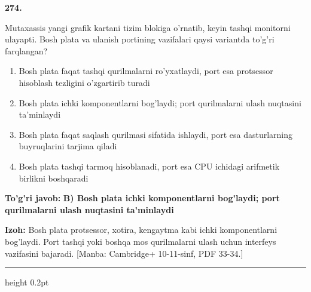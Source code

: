 \documentclass[10pt,a4paper]{article}
\begin{document}
{\bfseries\sffamily\color{ink} 274.}
\par
Mutaxassis yangi grafik kartani tizim blokiga o'rnatib, keyin tashqi monitorni ulayapti. Bosh plata va ulanish portining vazifalari qaysi variantda to'g'ri farqlangan?
\begin{enumerate}[label=\Alph*),leftmargin=9mm]
\item Bosh plata faqat tashqi qurilmalarni ro'yxatlaydi, port esa protsessor hisoblash tezligini o'zgartirib turadi
\item Bosh plata ichki komponentlarni bog'laydi; port qurilmalarni ulash nuqtasini ta'minlaydi
\item Bosh plata faqat saqlash qurilmasi sifatida ishlaydi, port esa dasturlarning buyruqlarini tarjima qiladi
\item Bosh plata tashqi tarmoq hisoblanadi, port esa CPU ichidagi arifmetik birlikni boshqaradi
\end{enumerate}
\begin{tcolorbox}[enhanced,breakable,colback=teal!4,colframe=teal!60!black,boxrule=0.45pt,arc=1.2mm,left=2.7mm,right=2.7mm,top=1.8mm,bottom=1.8mm,before skip=2mm,after skip=2mm]
{\bfseries\sffamily\color{teal}To'g'ri javob:} \textbf{B) Bosh plata ichki komponentlarni bog'laydi; port qurilmalarni ulash nuqtasini ta'minlaydi}
\par\smallskip
{\bfseries Izoh:} Bosh plata protsessor, xotira, kengaytma kabi ichki komponentlarni bog'laydi. Port tashqi yoki boshqa mos qurilmalarni ulash uchun interfeys vazifasini bajaradi. [Manba: Cambridge+ 10-11-sinf, PDF 33-34.]
\end{tcolorbox}
\vspace{2mm}\hrule height 0.2pt\vspace{3mm}
\end{document}
